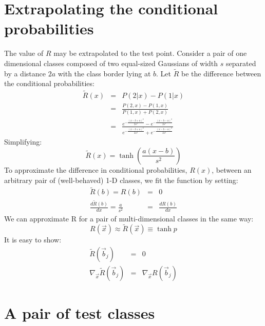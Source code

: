 \section{Extrapolating the conditional probabilities}

The value of $R$ may be extrapolated to the test point.
Consider a pair of one dimensional classes composed of two equal-sized 
Gaussians of width $s$ separated by a distance $2a$ 
with the class border lying at $b$.
Let $\tilde R$ be the difference between the conditional probabilities:
\begin{eqnarray}
  \tilde R(x) & = & P(2|x) - P(1|x) \\
  & = & \frac{P(2, x) - P(1, x)}{P(1, x) + P(2, x)} \\
  & = & \frac{e^{-\frac{(x-b+a)^2}{2 s^2}} -
                e^{-\frac{(x-b-a)^2}{2 s^2}}}
                {e^{-\frac{(x-b+a)^2}{2 s^2}} +
                e^{-\frac{(x-b-a)^2}{2 s^2}}}
\end{eqnarray}
Simplifying:
\begin{equation}
\tilde R (x) = \tanh \left (\frac {a(x-b)}{s^2} \right )
\label{cext:r1sim}
\end{equation}
To approximate the difference in
conditional probabilities, $R(x)$, between an arbitrary pair of (well-behaved)
1-D classes, we fit the function by setting:
\begin{eqnarray}
\tilde R(b) = R(b) & = & 0 \\
\frac{d\tilde R(b)}{dx} = \frac{a}{s^2} & = & \frac{dR(b)}{dx}
\end{eqnarray}
We can approximate R for a pair of multi-dimensional classes 
in the same way:
\begin{equation}
R(\vec x) \approx \tilde R(\vec x) \equiv \tanh p
\label{confidence_est}
\end{equation}
It is easy to show:
\begin{eqnarray}
\tilde R(\vec b_j) & = & 0 \\
\nabla_{\vec x} \tilde R(\vec b_j) & = &\nabla_{\vec x} R(\vec b_j)
\end{eqnarray}

\section{A pair of test classes}
\label{test_classes}

